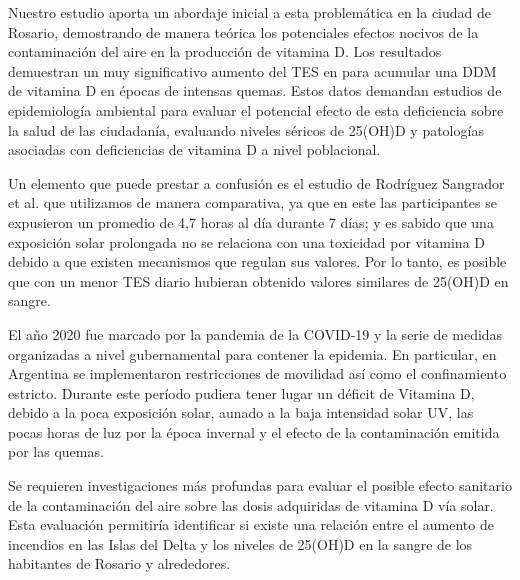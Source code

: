 Nuestro estudio aporta un abordaje inicial a esta problemática en la ciudad de Rosario, demostrando de manera teórica los potenciales efectos nocivos de la contaminación del aire en la producción de vitamina D. Los resultados demuestran un muy significativo aumento del TES  en para acumular una DDM de vitamina D en épocas de intensas quemas. Estos datos demandan estudios de epidemiología ambiental para evaluar el potencial efecto de esta deficiencia sobre la salud de las ciudadanía, evaluando niveles séricos de 25(OH)D y patologías asociadas con deficiencias de vitamina D a nivel poblacional.

Un elemento que puede prestar a confusión es el estudio de Rodríguez Sangrador et al. que utilizamos de manera comparativa, ya que en este las participantes se expusieron un promedio de 4,7 horas al día durante 7 días; y es sabido que una exposición solar prolongada no se relaciona con una toxicidad por vitamina D debido a que existen mecanismos que regulan sus valores\cite{Holick_2010}. Por lo tanto, es posible que con un menor TES diario hubieran obtenido valores similares de 25(OH)D en sangre.

El año 2020 fue marcado por la pandemia de la COVID-19 y la serie de medidas organizadas a nivel gubernamental para contener la epidemia. En particular, en Argentina se implementaron restricciones de movilidad así como el confinamiento estricto. Durante este período pudiera tener lugar un déficit de Vitamina D, debido a la poca exposición solar, aunado a la baja intensidad solar UV, las pocas horas de luz por la época invernal y el efecto de la contaminación emitida por las quemas.

Se requieren investigaciones más profundas para evaluar el posible efecto sanitario de la contaminación del aire sobre las dosis adquiridas de vitamina D vía solar. Esta evaluación permitiría identificar si existe una relación entre el aumento de incendios en las Islas del Delta y los niveles de 25(OH)D en la sangre de los habitantes de Rosario y alrededores.
